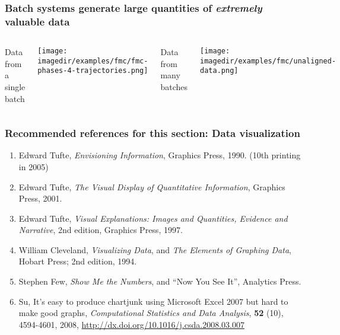 \begin{frame}\frametitle{Batch systems generate large quantities of \emph{extremely} valuable data}
	\begin{columns}[t]
			Data from a single batch
			\begin{center}
				\texttt{[image: \\imagedir/examples/fmc/fmc-phases-4-trajectories.png]}
			\end{center}
			Data from many batches
			\begin{center}
				\texttt{[image: \\imagedir/examples/fmc/unaligned-data.png]}
			\end{center}
	\end{columns}
\end{frame}

\begin{frame}\frametitle{Recommended references for this section: Data visualization}
	\begin{enumerate}
		\item	Edward Tufte, \emph{Envisioning Information}, Graphics Press, 1990. (10th printing in 2005) 
		\item	Edward Tufte, \emph{The Visual Display of Quantitative Information}, Graphics Press, 2001. 
		\item	Edward Tufte, \emph{Visual Explanations: Images and Quantities, Evidence and Narrative}, 2nd edition, Graphics Press, 1997. 
		\item	William Cleveland, \emph{Visualizing Data}, and \emph{The Elements of Graphing Data}, Hobart Press; 2nd edition, 1994. 
		\item	Stephen Few, \emph{Show Me the Numbers}, and ``Now You See It'', Analytics Press. 
		\item	Su, It's easy to produce chartjunk using Microsoft Excel 2007 but hard to make good graphs, \emph{Computational Statistics and Data Analysis}, \textbf{52} (10), 4594-4601, 2008, \href{http://dx.doi.org/10.1016/j.csda.2008.03.007}{http://dx.doi.org/10.1016/j.csda.2008.03.007} 
	\end{enumerate}
\end{frame}

